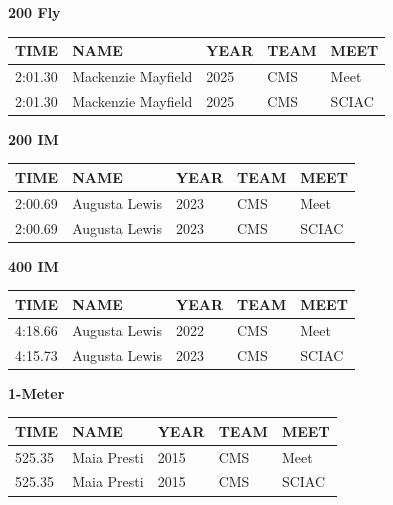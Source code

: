 \begin{table}[H]
\centering
\begin{minipage}[t]{0.48\textwidth}
\centering
\textbf{200 Fly}\\[0.1cm]
\begin{tabular}{@{}p{1.8cm}p{2.8cm}p{1.2cm}p{1.4cm}p{1.4cm}@{}}
\hline
    \textbf{TIME} & \textbf{NAME} & \textbf{YEAR} & \textbf{TEAM} & \textbf{MEET} \\
\hline
    2:01.30 & Mackenzie Mayfield & 2025 & CMS & Meet \\
    2:01.30 & Mackenzie Mayfield & 2025 & CMS & SCIAC \\
\hline
\end{tabular}
\end{minipage}\hfill
\begin{minipage}[t]{0.48\textwidth}
\centering
\textbf{200 IM}\\[0.1cm]
\begin{tabular}{@{}p{1.8cm}p{2.8cm}p{1.2cm}p{1.4cm}p{1.4cm}@{}}
\hline
    \textbf{TIME} & \textbf{NAME} & \textbf{YEAR} & \textbf{TEAM} & \textbf{MEET} \\
\hline
    2:00.69 & Augusta Lewis & 2023 & CMS & Meet \\
    2:00.69 & Augusta Lewis & 2023 & CMS & SCIAC \\
\hline
\end{tabular}
\end{minipage}
\end{table}

\begin{table}[H]
\centering
\begin{minipage}[t]{0.6\textwidth}
\centering
\textbf{400 IM}\\[0.1cm]
\begin{tabular}{@{}p{1.8cm}p{2.8cm}p{1.2cm}p{1.4cm}p{1.4cm}@{}}
\hline
    \textbf{TIME} & \textbf{NAME} & \textbf{YEAR} & \textbf{TEAM} & \textbf{MEET} \\
\hline
    4:18.66 & Augusta Lewis & 2022 & CMS & Meet \\
    4:15.73 & Augusta Lewis & 2023 & CMS & SCIAC \\
\hline
\end{tabular}
\end{minipage}
\end{table}

\begin{table}[H]
\centering
\begin{minipage}[t]{0.6\textwidth}
\centering
\textbf{1-Meter}\\[0.1cm]
\begin{tabular}{@{}p{1.8cm}p{2.8cm}p{1.2cm}p{1.4cm}p{1.4cm}@{}}
\hline
    \textbf{TIME} & \textbf{NAME} & \textbf{YEAR} & \textbf{TEAM} & \textbf{MEET} \\
\hline
    525.35 & Maia Presti & 2015 & CMS & Meet \\
    525.35 & Maia Presti & 2015 & CMS & SCIAC \\
\hline
\end{tabular}
\end{minipage}
\end{table}


